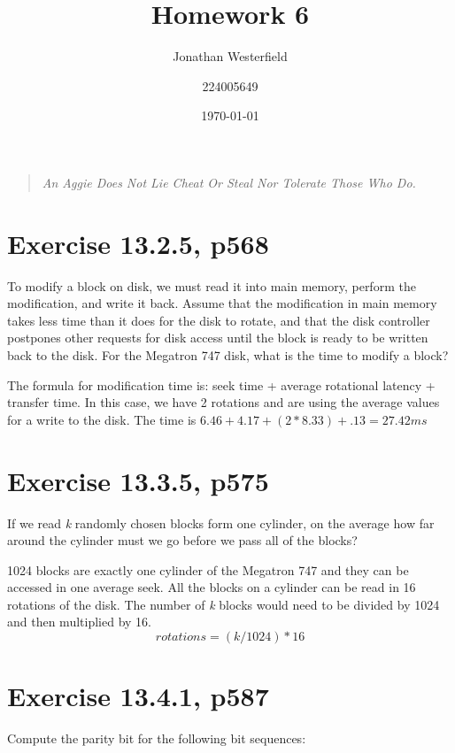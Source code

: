\documentclass [a4paper,12pt] {article}
\begin{document}
\title{
    Homework 6
}
\author{
    Jonathan Westerfield
    \and
    224005649
}
\date{\today}
\maketitle

\begin{quote} 
\centering 
\textit {
    An Aggie Does Not Lie Cheat Or Steal Nor Tolerate Those Who Do.
}
\end{quote}
\newpage

\section {Exercise 13.2.5, p568}
    To modify a block on disk, we must read it into main memory, perform the 
    modification, and write it back. Assume that the modification in main memory 
    takes less time than it does for the disk to rotate, and that the disk 
    controller postpones other requests for disk access until the block is ready
    to be written back to the disk. For the Megatron 747 disk, what is the time
    to modify a block?

    \vspace{.2in}

    The formula for modification time is: seek time + average rotational latency 
    + transfer time. In this case, we have 2 rotations and are using the average 
    values for a write to the disk. The time is 
    \(6.46 + 4.17 + (2 * 8.33) +.13 = 27.42 ms\)
\section{Exercise 13.3.5, p575}
    If we read \textit{k} randomly chosen blocks form one cylinder, on the
    average how far around the cylinder must we go before we pass all of the 
    blocks?

    \vspace{.2in}

    1024 blocks are exactly one cylinder of the Megatron 747 and they can be 
    accessed in one average seek. All the blocks on a cylinder can be read in 
    16 rotations of the disk. The number of \textit{k} blocks would need to be
    divided by 1024 and then multiplied by 16.
    \[rotations = (k / 1024) * 16\]
\section{Exercise 13.4.1, p587}
    Compute the parity bit for the following bit sequences:
\end{document}
